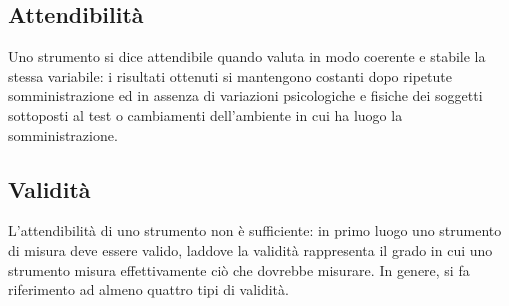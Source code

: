 \subsection{Attendibilità}
\label{sec:reliability}

Uno strumento si dice attendibile quando valuta in modo coerente e stabile la stessa variabile: i risultati ottenuti si mantengono costanti dopo ripetute somministrazione ed in assenza di variazioni psicologiche e fisiche dei soggetti sottoposti al test o cambiamenti dell'ambiente in cui ha luogo la somministrazione. 


\subsection{Validità}
\label{sec:validity}

L'attendibilità di uno strumento non è sufficiente: 
in primo luogo uno strumento di misura deve essere valido, laddove la validità rappresenta il grado in cui uno strumento misura effettivamente ciò che dovrebbe misurare. 
In genere, si fa riferimento ad almeno quattro tipi di validità.
